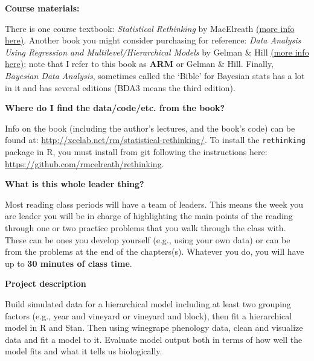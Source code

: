\documentclass[11pt]{article}
\begin{document}
\begin{large}
{\raggedright \textbf{Course materials:}}
\end{large}
\noindent There is one course textbook: \emph{Statistical Rethinking} by MacElreath \href{http://xcelab.net/rm/statistical-rethinking/}{(more info here)}. Another book you might consider purchasing for reference: \emph{Data Analysis Using Regression and Multilevel/Hierarchical Models} by Gelman \& Hill \href{http://www.stat.columbia.edu/~gelman/arm/}{(more info here)}; note that I refer to this book as {\bf ARM} or Gelman \& Hill. Finally, \emph{Bayesian Data Analysis}, sometimes called the `Bible' for Bayesian stats has a lot in it and has several editions (BDA3 means the third edition).  \\ %

\begin{large} 
{\raggedright \textbf{Where do I find the data/code/etc. from the book?}}
\end{large} Info on the book (including the author's lectures, and the book's code) can be found at: \url{http://xcelab.net/rm/statistical-rethinking/}. To install the \verb|rethinking| package in R, you must install from git following the instructions here: \url{https://github.com/rmcelreath/rethinking}.\\

\begin{large} 
{\raggedright \textbf{What is this whole leader thing?}}
\end{large} Most reading class periods will have a team of leaders. This means the week you are leader you will be in charge of highlighting the main points of the reading through one or two practice problems that you walk through the class with. These can be ones you develop yourself (e.g., using your own data) or can be from the problems at the end of the chapters(s). Whatever you do, you will have up to {\bf 30 minutes of class time}. \\

\begin{large} 
{\raggedright \textbf{Project description}}
\end{large}
Build simulated data for a hierarchical model including at least two grouping factors (e.g., year and vineyard or vineyard and block), then fit a hierarchical model in R and Stan. Then using winegrape phenology data, clean and visualize data and fit a model to it. Evaluate model output both in terms of how well the model fits and what it tells us biologically. \\
\end{document}
